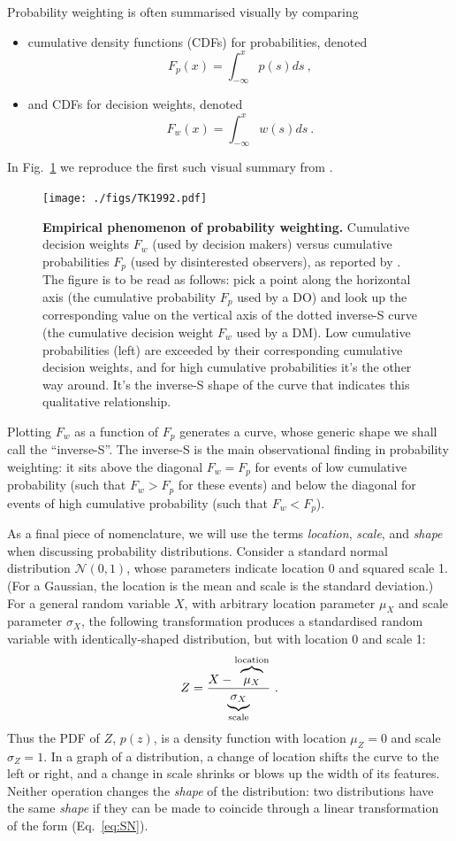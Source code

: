 \documentclass[a4paper, 12pt]{article}
\newcommand{\bi}{\begin{itemize}}
\newcommand{\ei}{\end{itemize}}
\newcommand{\elabel}[1]{\label{eq:#1}}
\newcommand{\eref}[1]{(Eq.~\ref{eq:#1})}
\newcommand{\flabel}[1]{\label{fig:#1}}
\newcommand{\fref}[1]{Fig.~\ref{fig:#1}}
\newcommand{\be}{\begin{equation}}
\newcommand{\ee}{\end{equation}}
\newcommand{\ND}{\mathcal{N}} %
\begin{document}
Probability weighting is often summarised visually by comparing 
\bi
\item cumulative density functions (CDFs) for probabilities, denoted 
\be
\elabel{DO_CDF}
F_p(x)=\int_{-\infty}^x p(s) ds~,
\ee
\item and CDFs for decision weights, denoted
\be
\elabel{DM_CDF}
F_w(x)=\int_{-\infty}^x w(s) ds~.
\ee
\ei
In \fref{TK1992} we reproduce the first such visual summary from \textcite[310]{TverskyKahneman1992}.
\begin{figure}[!htb]
\centering
\texttt{[image: ./figs/TK1992.pdf]}
\caption{\textbf{Empirical phenomenon of probability weighting.} Cumulative decision weights $F_w$ (used by decision makers) versus cumulative probabilities $F_p$ (used by disinterested observers), as reported by \textcite[p.~310, Fig. 1, relabelled axes]{TverskyKahneman1992}. The figure is to be read as follows: pick a point along the horizontal axis (the cumulative probability $F_p$ used by a DO) and look up the corresponding value on the vertical axis of the dotted inverse-S curve (the cumulative decision weight $F_w$ used by a DM). Low cumulative probabilities (left) are exceeded by their corresponding cumulative decision weights, and for high cumulative probabilities it's the other way around. It's the inverse-S shape of the curve that indicates this qualitative relationship.}
\flabel{TK1992}
\end{figure}

Plotting $F_w$ as a function of $F_p$ generates a curve, whose generic shape we shall call the ``inverse-S''. The inverse-S is the main observational finding in probability weighting: it sits above the diagonal $F_w=F_p$ for events of low cumulative probability (such that $F_w>F_p$ for these events) and below the diagonal for events of high cumulative probability (such that $F_w<F_p$).

As a final piece of nomenclature, we will use the terms \textit{location}, \textit{scale}, and \textit{shape} when discussing probability distributions. Consider a standard normal distribution $\ND(0,1)$, whose parameters indicate location 0 and squared scale 1. (For a Gaussian, the location is the mean and scale is the standard deviation.) For a general random variable $X$, with arbitrary location parameter $\mu_X$ and scale parameter $\sigma_X$, the following transformation produces a standardised random variable with identically-shaped distribution, but with location 0 and scale 1:
\be
Z = \frac{X-\overbrace{\mu_X \mathstrut}^{\text{location}}}{\underbrace{\sigma_X\mathstrut}_{\text{scale}}}~.
\elabel{SN}
\ee
Thus the PDF of $Z$, $p(z)$, is a density function with location $\mu_Z=0$ and scale $\sigma_Z=1$. In a graph of a distribution, a change of location shifts the curve to the left or right, and a change in scale shrinks or blows up the width of its features. Neither operation changes the \textit{shape} of the distribution: two distributions have the same \textit{shape} if they can be made to coincide through a linear transformation of the form \eref{SN}.
\end{document}

